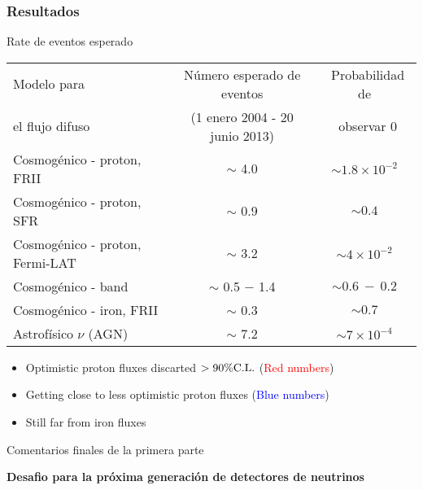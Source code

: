 \begin{frame}
	\frametitle{Resultados}
		\scriptsize
		\begin{block}{Rate de eventos esperado}
			\begin{center}
				\renewcommand{\arraystretch}{2.0}
				\begin{tabular}{l c c} 
	\hline
	Modelo para       &  Número esperado de eventos     & ~Probabilidad de   \\
	el flujo difuso   &  (1 enero 2004 - 20 junio 2013) & ~observar $0$   \\
	\hline
	Cosmogénico - proton, FRII \cite{Kampert_GZK}     &  $\sim$ 4.0  & $\sim 1.8\times 10^{-2}$ \\

	Cosmogénico - proton, SFR \cite{Kampert_GZK}      &  $\sim$ 0.9  & $\sim 0.4$               \\

	Cosmogénico - proton, Fermi-LAT \cite{Ahlers_GZK} &  $\sim$ 3.2  & $\sim 4\times 10^{-2}$   \\

	Cosmogénico - band \cite{Kotera_GZK}              &  $\sim$ 0.5 $-$ 1.4 & $\sim 0.6~-~0.2$ \\

	Cosmogénico - iron, FRII \cite{Kampert_GZK}       &  $\sim$ 0.3  & $\sim 0.7$ \\

	\hline

	Astrofísico $\nu$ (AGN) \cite{Becker_AGN}     &  $\sim$ 7.2  & $\sim 7\times 10^{-4}$ \\

% 

	\hline
	\end{tabular}
			\end{center}
		\end{block}
		\begin{alertblock}{}
			\begin{itemize}
			 \item Optimistic proton fluxes discarted $>90\%\rm C.L.$ (\textcolor{Red}{Red numbers})
			 \item Getting close to less optimistic proton fluxes (\textcolor{Blue}{Blue numbers})
			 \item Still far from iron fluxes
			\end{itemize}
		\end{alertblock}
	\end{frame}
% 	
	\begin{frame}{Comentarios finales de la primera parte}
		\begin{center}
		\end{center}
		\begin{block}{}
		 \centering
		 \textbf{Desafio para la pr\'oxima generaci\'on de detectores de neutrinos}
		\end{block}
	\end{frame}
